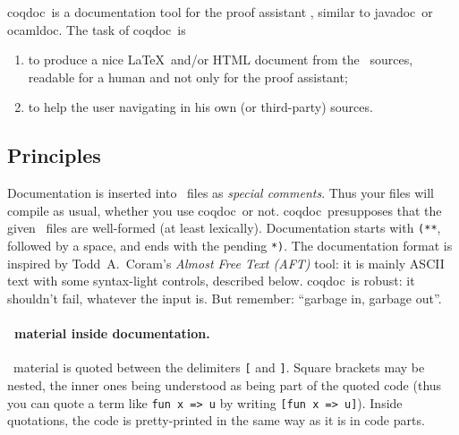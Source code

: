 
\newcommand{\javadoc}{\textsf{javadoc}}
\newcommand{\ocamldoc}{\textsf{ocamldoc}}
\newcommand{\coqdoc}{\textsf{coqdoc}}
\newcommand{\texmacs}{\TeX{}macs}
\newcommand{\monurl}[1]{#1}
\newcommand{\mm}{\symbol{45}\symbol{45}}


\coqdoc\ is a documentation tool for the proof assistant
\Coq, similar to \javadoc\ or \ocamldoc. 
The task of \coqdoc\ is
\begin{enumerate}
\item to produce a nice \LaTeX\ and/or HTML document from the \Coq\ 
  sources, readable for a human and not only for the proof assistant;
\item to help the user navigating in his own (or third-party) sources.
\end{enumerate}



\subsection{Principles}

Documentation is inserted into \Coq\ files as \emph{special comments}.  
Thus your files will compile as usual, whether you use \coqdoc\ or not.
\coqdoc\ presupposes that the given \Coq\ files are well-formed (at
least lexically).  Documentation starts with
\texttt{(**}, followed by a space, and ends with the pending \texttt{*)}. 
The documentation format is inspired
  by Todd~A.~Coram's \emph{Almost Free Text (AFT)} tool: it is mainly
ASCII text with some syntax-light controls, described below.
\coqdoc\ is robust: it shouldn't fail, whatever the input is. But
remember: ``garbage in, garbage out''.

\paragraph{\Coq\ material inside documentation.}
\Coq\ material is quoted between the
delimiters \texttt{[} and \texttt{]}. Square brackets may be nested,
the inner ones being understood as being part of the quoted code (thus
you can quote a term like \texttt{fun x => u} by writing
\texttt{[fun x => u]}). Inside quotations, the code is pretty-printed in
the same way as it is in code parts.

